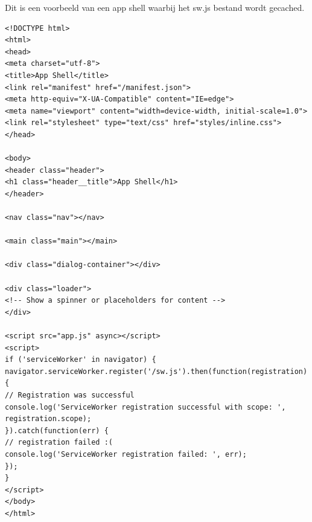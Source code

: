 Dit is een voorbeeld van een app shell waarbij het sw.js bestand wordt gecached. 


	\begin{lstlisting}
<!DOCTYPE html>
<html>
<head>
<meta charset="utf-8">
<title>App Shell</title>
<link rel="manifest" href="/manifest.json">
<meta http-equiv="X-UA-Compatible" content="IE=edge">
<meta name="viewport" content="width=device-width, initial-scale=1.0">
<link rel="stylesheet" type="text/css" href="styles/inline.css">
</head>

<body>
<header class="header">
<h1 class="header__title">App Shell</h1>
</header>

<nav class="nav"></nav>

<main class="main"></main>

<div class="dialog-container"></div>

<div class="loader">
<!-- Show a spinner or placeholders for content -->
</div>

<script src="app.js" async></script>
<script>
if ('serviceWorker' in navigator) {
navigator.serviceWorker.register('/sw.js').then(function(registration) {
// Registration was successful
console.log('ServiceWorker registration successful with scope: ', registration.scope);
}).catch(function(err) {
// registration failed :(
console.log('ServiceWorker registration failed: ', err);
});
}
</script>
</body>
</html>
	\end{lstlisting}


